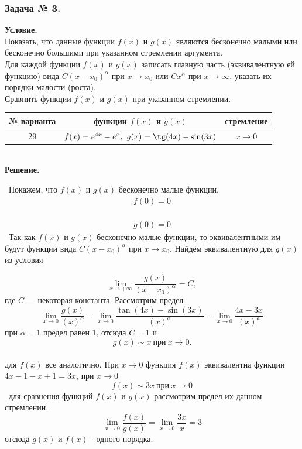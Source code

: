 \documentclass[12pt]{article}
\begin{document}
\subsubsection*{\center Задача № 3.}
{\bf Условие.~}\\
 Показать, что данные функции
$f(x)$ и $g(x)$ являются бесконечно малыми или бесконечно большими
при указанном стремлении аргумента. \\
 Для каждой функции $f(x)$ и $g(x)$ записать главную часть
(эквивалентную ей функцию)  вида $C(x-x_0)^{\alpha}$ при $x\rightarrow x_0$ или $Cx^{\alpha}$
при $x\rightarrow\infty$, указать их порядки малости (роста). \\
 Сравнить функции $f(x)$ и $g(x)$ при указанном стремлении.
\begin{center}
	\begin{tabular}{|c|c|c|}
		\hline
		№ варианта & функции $f(x)$ и $g(x)$ & стремление \\[6pt]
		\hline
		29 & $f(x) = e^{4x} - e^x,~g(x)= \tg(4x) - \sin(3x)$ & $x\rightarrow 0$ \\
		\hline
	\end{tabular}
\bigskip
\\
{\bf Решение.~}\\
\end{center}
\medskip
{}~Покажем, что $f(x)$ и $g(x)$ бесконечно малые функции.
\\
$$
\begin{array}{cc}
f(0) = 0
\end{array}
$$
\\
$$
\begin{array}{cc}
g(0) = 0
\end{array}
$$
~Так как $f(x)$ и $g(x)$ бесконечно малые функции, то эквивалентными им будут функции вида 
$C{(x-x_{0})^{\alpha}}$ при $x\rightarrow x_{0}$. Найдём эквивалентную для $g(x)$ из условия

$$
\lim\limits_{x\rightarrow+\infty}\dfrac{g(x)}{(x-x_{0})^{\alpha}} = C,
$$
где $C$ --- некоторая константа. Рассмотрим предел
$$
\lim\limits_{x\rightarrow 0}\dfrac{g(x)}{(x)^\alpha}=\lim\limits_{x\rightarrow 0}\dfrac{\tan(4x) - \sin(3x)}{(x)^\alpha}=\lim\limits_{x\rightarrow 0}\dfrac{4x - 3x}{(x)^a}
$$
при $\alpha=1$ предел равен $1$, отсюда $C=1$ и \\$$ g(x)\sim x ~\text{при}~x\rightarrow 0.$$
\\
для $f(x)$ все аналогично. При $x\rightarrow 0$ функция $f(x)$ эквивалентна функции $4x - 1 - x + 1 = 3x$, при $x \rightarrow 0$
$$ f(x)\sim 3x ~\text{при}~x\rightarrow 0$$
~для сравнения функций $f(x)$ и $g(x)$ рассмотрим предел их данном стремлении.
$$
\lim\limits_{x\rightarrow 0}\dfrac{f(x)}{g(x)}=\lim\limits_{x\rightarrow0}\dfrac{3x}{x}=3
$$
отсюда $g(x)$ и $f(x)$ - одного порядка.
\end{document}
